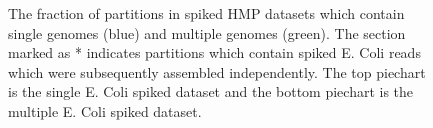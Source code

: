 \documentclass[11pt]{article} %
\begin{document}
\begin{figure}[h!]
\caption{The fraction of partitions in spiked HMP datasets which contain single genomes (blue) and multiple genomes (green).  The section marked as * indicates partitions which contain spiked E. Coli reads which were subsequently assembled independently.  The top piechart is the single E. Coli spiked dataset and the bottom piechart is the multiple E. Coli spiked dataset.}
\label{ecolimap}
\end{figure}
\end{document}
